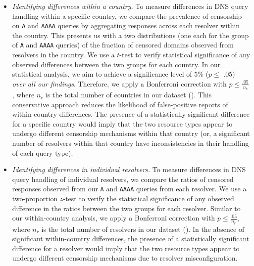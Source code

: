 \begin{itemize}
  \item {\it Identifying differences within a country.} To measure differences
    in DNS query handling within a specific country, we compare the prevalence
    of censorship on {\tt A} and {\tt AAAA} queries by aggregating responses
    across {each resolver within the country}. This presents us with a two
    distributions (one each for the group of {\tt A} and {\tt AAAA} queries) of
    the fraction of censored domains observed from resolvers in the country.
    We use a $t$-test to verify statistical significance of any observed
    differences between the two groups for each country. In our statistical
    analysis, we aim to achieve a significance level of 5\% ($p \leq$  .05)
    \emph{over all our findings}. Therefore, we apply a Bonferroni correction
    with $p \leq \frac{.05}{n_{c}}$, where $n_c$ is the total number of
    countries in our dataset (). This conservative approach reduces
    the likelihood of false-positive reports of within-country differences.
    The presence of a statistically significant difference for a specific
    country would imply that the two resource types appear to undergo different
    censorship mechanisms within that country (or, a significant number of
    resolvers within that country have inconsistencies in their handling of
    each query type).

  \item {\it Identifying differences in individual resolvers.} To measure
    differences in DNS query handling of individual resolvers, we compare the
    ratios of censored responses observed from our {\tt A} and {\tt AAAA}
    queries {from each resolver}. 
    We use a two-proportion $z$-test to verify the statistical significance of
    any observed difference in the ratios between the two groups for each
    resolver. Similar to our within-country analysis, we apply a Bonferroni
    correction with $p \leq \frac{.05}{n_r}$, where $n_r$ is the total number
    of resolvers in our dataset ().
    In the absence of significant within-country differences, the presence of
    a statistically significant difference for a resolver would imply that the
    two resource types appear to undergo different censorship mechanisms due to
    resolver misconfiguration.


\end{itemize}
